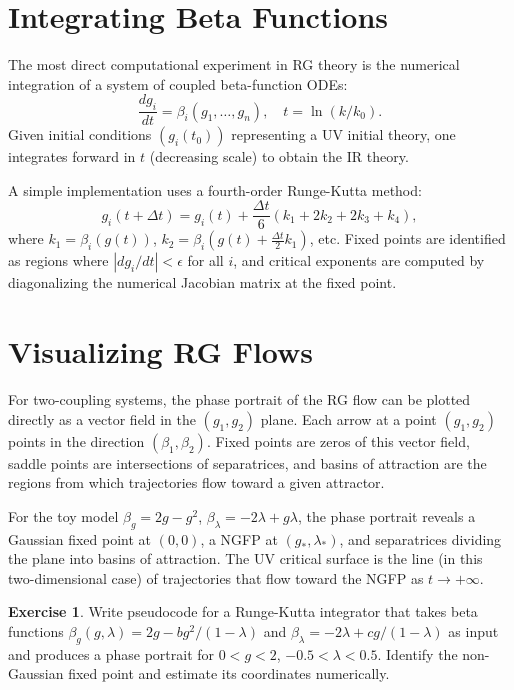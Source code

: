 \documentclass[12pt,a4paper,oneside]{book}
\theoremstyle{definition}
\newtheorem{exercise}{Exercise}[chapter]
\theoremstyle{plain}
\theoremstyle{remark}
\begin{document}
\section{Integrating Beta Functions}

The most direct computational experiment in RG theory is the numerical
integration of a system of coupled beta-function ODEs:
\begin{equation}
\frac{dg_i}{dt} = \beta_i(g_1,\ldots,g_n), \quad t = \ln(k/k_0).
\end{equation}
Given initial conditions $(g_i(t_0))$ representing a UV initial theory,
one integrates forward in $t$ (decreasing scale) to obtain the IR theory.

A simple implementation uses a fourth-order Runge-Kutta method:
\begin{equation}
g_i(t + \Delta t) = g_i(t) + \frac{\Delta t}{6}(k_1 + 2k_2 + 2k_3 + k_4),
\end{equation}
where $k_1 = \beta_i(g(t))$, $k_2 = \beta_i(g(t) + \frac{\Delta t}{2}k_1)$, etc.
Fixed points are identified as regions where $|dg_i/dt| < \epsilon$ for
all $i$, and critical exponents are computed by diagonalizing the numerical
Jacobian matrix at the fixed point.

\section{Visualizing RG Flows}

For two-coupling systems, the phase portrait of the RG flow can be plotted
directly as a vector field in the $(g_1, g_2)$ plane. Each arrow at a point
$(g_1, g_2)$ points in the direction $(\beta_1, \beta_2)$. Fixed points are
zeros of this vector field, saddle points are intersections of separatrices,
and basins of attraction are the regions from which trajectories flow toward
a given attractor.

For the toy model $\beta_g = 2g - g^2$, $\beta_\lambda = -2\lambda + g\lambda$,
the phase portrait reveals a Gaussian fixed point at $(0,0)$, a NGFP at
$(g_*,\lambda_*)$, and separatrices dividing the plane into basins of attraction.
The UV critical surface is the line (in this two-dimensional case) of
trajectories that flow toward the NGFP as $t \to +\infty$.

\begin{exercise}
Write pseudocode for a Runge-Kutta integrator that takes beta functions
$\beta_g(g,\lambda) = 2g - bg^2/(1-\lambda)$ and $\beta_\lambda = -2\lambda + cg/(1-\lambda)$
as input and produces a phase portrait for $0 < g < 2$, $-0.5 < \lambda < 0.5$.
Identify the non-Gaussian fixed point and estimate its coordinates numerically.
\end{exercise}
\end{document}
